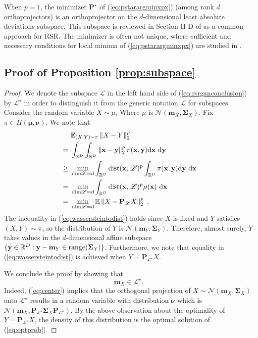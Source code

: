 \documentclass{article} \usepackage{iclr2020_conference,times}
\def\eqref#1{(\ref{#1})}
\def\LL{{\mathscr{L}}}
\def\rvm{{\mathbf{m}}}
\def\rvmu{{\mathbf{\mu}}}
\def\rvnu{{\mathbf{\nu}}}
\def\rvx{{\mathbf{x}}}
\def\rvy{{\mathbf{y}}}
\def\rmP{{\mathbf{P}}}
\def\rmSigma{{\mathbf{\Sigma}}}
\newcommand{\E}{\mathbb{E}}
\newcommand{\R}{\mathbb{R}}
\newcommand{\norm}[1]{\left\lVert#1\right\rVert}
\begin{document}
When $p=1$, the minimizer $\rmP^{\star}$
of \eqref{eq:pstarargminxpx} (among rank $d$ orthoprojectors) is an orthoprojector on the $d$-dimensional least absolute deviations subspace.
This subspace is reviewed in Section II-D of   \citet{lerman2018overview} as a common approach for RSR. 
The minimizer is often not unique, where sufficient and necessary conditions for local minima of \eqref{eq:pstarargminxpx} are studied in \citet{lp_recovery_part1_11}.


\subsection{Proof of Proposition \ref{prop:subspace}}
\label{sec:proofsubspace}

\begin{proof}We denote the subspace $\LL$ in the left hand side of \eqref{eq:rsrganconclusion} by $\LL^{\star}$ in order to distinguish it from the generic notation $\LL$ for subspaces. 
Consider the random variable $X \sim \mu$, Where $\mu$ is $\mathcal{N}(\rvm_X, \rmSigma_X)$. Fix $\pi \in \Pi(\rvmu, \rvnu)$. We note that 
\begin{align}
& \E_{(X,Y) \sim \pi} \norm{X-Y}_2^p \nonumber \\
~=~ & \int_{\R^D} \int_{\R^D} {\norm{\rvx-\rvy}_2^p \pi(\rvx,\rvy) } \rm{d}\rvx ~ \rm{d}\rvy \nonumber \\
~\geq~ & \min_{\rm{dim} \LL = d} \int_{\R^D} \rm{dist}(\rvx,\LL)^p \int_{\R^D} {\pi(\rvx,\rvy)} \rm{d}\rvy ~ \rm{d}\rvx \label{eq:wassersteintodist} \\
~=~ & \min_{\rm{dim} \LL = d} \int_{\R^D} \rm{dist}(\rvx,\LL)^p \mu(\rvx) ~ \rm{d}\rvx \nonumber
\\
~=~ & \min_{\rm{dim} \LL = d} \E \norm{X - \rmP_\LL X}_2^p
~. \nonumber
\end{align}
The inequality in \eqref{eq:wassersteintodist} holds since $X$ is fixed and $Y$ satisfies $(X,Y) \sim \pi$, so the distribution of $Y$ is $\mathcal{N}(\rvm_Y, \rmSigma_Y)$. Therefore, almost surely, $Y$ takes values in the $d$-dimensional affine subspace $\{\rvy \in \R^D: \rvy - \rvm_Y \in \rm{range}(\rmSigma_Y)\}$.
Furthermore, we note that equality in \eqref{eq:wassersteintodist} is achieved when $Y = \rmP_{\LL^{\star}} X$. 

We conclude the proof by showing that 
\begin{equation}
\label{eq:center}
\rvm_X \in \LL^{\star}.
\end{equation}
Indeed, \eqref{eq:center} implies that the orthogonal projection of $X \sim \mathcal{N}(\rvm_X, \rmSigma_X)$ onto $\LL^{\star}$
results in a random variable with distribution $\rvnu$ which is $\mathcal{N} (\rvm_X, \rmP_{\LL^{\star}} \rmSigma_X \rmP_{\LL^{\star}})$. By the above observation about the optimality of $Y = \rmP_{\LL^{\star}} X$, the density of this distribution is the optimal solution of \eqref{eq:optprob}.


\end{proof}
\end{document}
